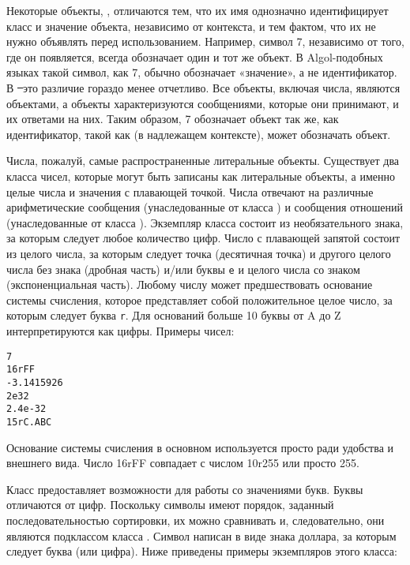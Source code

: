 
Некоторые объекты, , отличаются тем, что их имя однозначно идентифицирует 
класс и значение объекта, независимо от контекста, и тем фактом, что их не нужно 
объявлять перед использованием. Например, символ 7, независимо от того, где он 
появляется, всегда обозначает один и тот же объект. В Algol-подобных языках 
такой символ, как 7, обычно обозначает «значение», а не идентификатор. В
\st\ это различие гораздо менее отчетливо. Все объекты, включая числа, являются 
объектами, а объекты характеризуются сообщениями, которые они принимают, и их 
ответами на них. Таким образом, 7 обозначает объект так же, как идентификатор, 
такой как  (в надлежащем контексте), может обозначать объект.

Числа, пожалуй, самые распространенные литеральные объекты. Существует два класса 
чисел, которые могут быть записаны как литеральные объекты, а именно целые числа и 
значения с плавающей точкой. Числа отвечают на различные арифметические сообщения 
(унаследованные от класса ) и сообщения отношений (унаследованные от класса 
). Экземпляр класса  состоит из необязательного знака, за которым 
следует любое количество цифр. Число с плавающей запятой состоит из целого числа, 
за которым следует точка (десятичная точка) и другого целого числа без знака 
(дробная часть) и/или буквы \verb|е| и целого числа со знаком (экспоненциальная часть). 
Любому числу может предшествовать основание системы счисления, которое представляет собой 
положительное целое число, за которым следует буква \verb|r|. Для оснований больше 10 
буквы от A до Z интерпретируются как цифры. Примеры чисел:

\begin{lstlisting}
7
16rFF
-3.1415926
2e32
2.4e-32
15rC.ABC
\end{lstlisting}
    
\noindent
Основание системы счисления в основном используется просто ради удобства и внешнего вида. 
Число 16rFF совпадает с числом 10r255 или просто 255.
    
Класс  предоставляет возможности для работы со значениями букв. Буквы отличаются 
от цифр. Поскольку символы имеют порядок, заданный последовательностью сортировки, 
их можно сравнивать и, следовательно, они являются подклассом класса . 
Символ написан в виде знака доллара, за которым следует буква (или цифра). 
Ниже приведены примеры экземпляров этого класса:
    
